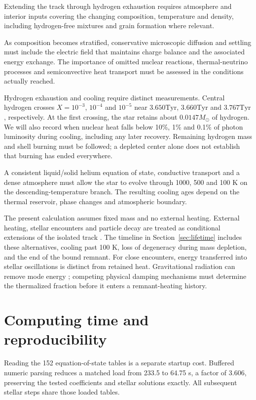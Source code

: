 \documentclass[11pt,letterpaper]{article}
\newcommand{\Ms}{M_\odot}\newcommand{\Rs}{R_\odot}\newcommand{\Ls}{L_\odot}
\newcommand{\Tyr}{\mathrm{Tyr}}
\begin{document}
Extending the track through hydrogen exhaustion requires atmosphere and
interior inputs covering the changing composition, temperature and density,
including hydrogen-free mixtures and grain formation where relevant.

As composition becomes stratified, conservative microscopic diffusion and
settling must include the electric field that maintains charge balance and
the associated energy exchange. The importance of omitted nuclear reactions,
thermal-neutrino processes and semiconvective heat transport must be assessed
in the conditions actually reached.

Hydrogen exhaustion and cooling require distinct measurements. Central
hydrogen crosses $X=10^{-3}$, $10^{-4}$ and $10^{-5}$ near
$3.650\Tyr$, $3.660\Tyr$ and $3.767\Tyr$, respectively. At the first
crossing, the star retains about $0.0147\Ms$ of hydrogen.
We will also record when nuclear heat
falls below 10\%, 1\% and 0.1\% of photon luminosity during cooling, including
any later recovery. Remaining hydrogen mass and shell burning must be followed;
a depleted center alone does not establish that burning has ended everywhere.

A consistent liquid/solid helium equation of state, conductive
transport and a dense atmosphere must allow the star to evolve through
1000, 500 and 100 K on the descending-temperature branch.
The resulting cooling ages depend on the thermal reservoir, phase changes
and atmospheric boundary.

The present calculation assumes fixed mass and no external heating.
External heating, stellar encounters and particle decay are treated as
conditional extensions of the isolated track \cite{adams97}. The timeline
in Section~\ref{sec:lifetime} includes these alternatives, cooling past 100 K,
loss of degeneracy during mass depletion, and the end of the bound remnant.
For close encounters, energy transferred into stellar oscillations is distinct
from retained heat. Gravitational radiation can remove mode energy
\cite{rathore05}; competing physical damping mechanisms must determine the
thermalized fraction before it enters a remnant-heating history.

\section{Computing time and reproducibility}
Reading the 152 equation-of-state tables is a separate startup cost.
Buffered numeric parsing reduces a matched load from 233.5 to 64.75 s,
a factor of 3.606, preserving the tested coefficients and stellar solutions
exactly. All subsequent stellar steps share those loaded tables.
\end{document}
